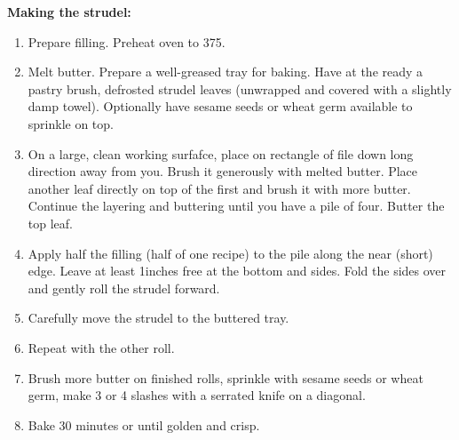 \textbf{Making the strudel:}

\begin{ingredients}
\end{ingredients}


\begin{recipe}
  \begin{enumerate}

  \item Prepare filling.  Preheat oven to 375\F.

  \item Melt butter.  Prepare a well-greased tray for baking.  Have at
    the ready a pastry brush, defrosted strudel leaves (unwrapped and
    covered with a slightly damp towel).  Optionally have sesame seeds
    or wheat germ available to sprinkle on top.

  \item On a large, clean working surfafce, place on rectangle of file
    down long direction away from you.  Brush it generously with
    melted butter.  Place another leaf directly on top of the first
    and brush it with more butter.  Continue the layering and
    buttering until you have a pile of four.  Butter the top leaf.

  \item Apply half the filling (half of one recipe) to the pile along
    the near (short) edge.  Leave at least 1\fracH inches free at the
    bottom and sides.  Fold the sides over and gently roll the strudel forward.

  \item Carefully move the strudel to the buttered tray.

  \item Repeat with the other roll.

  \item Brush more butter on finished rolls, sprinkle with sesame
    seeds or wheat germ, make 3 or 4 slashes with a serrated knife on
    a diagonal.

  \item Bake 30 minutes or until golden and crisp.

  \end{enumerate}
\end{recipe}

